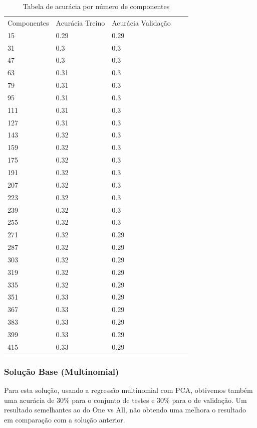 \documentclass[conference]{IEEEtran}
\begin{document}
\begin{table}[H]
\centering
\caption{Tabela de acurácia por número de componentes}
\label{my-label}
\begin{tabular}{lllll}
Componentes & Acurácia Treino & Acurácia Validação & & \\
15  & 0.29 & 0.29 &  &  \\
31  & 0.3  & 0.3  &  &  \\
47  & 0.3  & 0.3  &  &  \\
63  & 0.31 & 0.3  &  &  \\
79  & 0.31 & 0.3  &  &  \\
95  & 0.31 & 0.3  &  &  \\
111 & 0.31 & 0.3  &  &  \\
127 & 0.31 & 0.3  &  &  \\
143 & 0.32 & 0.3  &  &  \\
159 & 0.32 & 0.3  &  &  \\
175 & 0.32 & 0.3  &  &  \\
191 & 0.32 & 0.3  &  &  \\
207 & 0.32 & 0.3  &  &  \\
223 & 0.32 & 0.3  &  &  \\
239 & 0.32 & 0.3  &  &  \\
255 & 0.32 & 0.3  &  &  \\
271 & 0.32 & 0.29 &  &  \\
287 & 0.32 & 0.29 &  &  \\
303 & 0.32 & 0.29 &  &  \\
319 & 0.32 & 0.29 &  &  \\
335 & 0.32 & 0.29 &  &  \\
351 & 0.33 & 0.29 &  &  \\
367 & 0.33 & 0.29 &  &  \\
383 & 0.33 & 0.29 &  &  \\
399 & 0.33 & 0.29 &  &  \\
415 & 0.33 & 0.29 &  & 
\end{tabular}
\end{table}

\subsubsection{Solução Base (Multinomial)}
Para esta solução, usando a regressão multinomial com PCA, obtivemos também uma acurácia de 30\% para o conjunto de testes e 30\% para o de validação. Um resultado semelhantes ao do One vs All, não obtendo uma melhora o resultado em comparação com a solução anterior.
\end{document}
